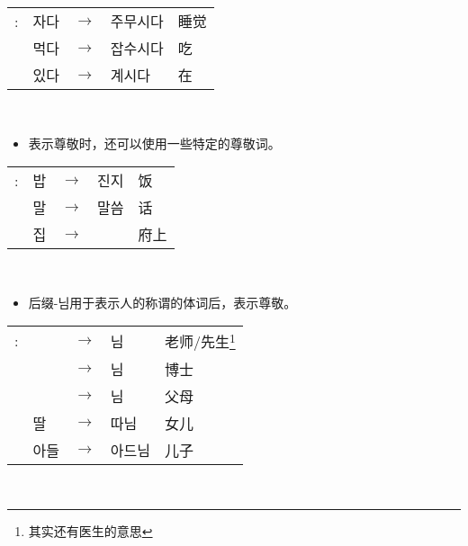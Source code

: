 \begin{grammar}
\begin{grammarsect}[\kr -(으){}시-]
\begin{tabular}{lllll}
            \kr \ruby{例}{예}: &\kr 자다&$\to$&\kr 주무시다&睡觉\\
            &\kr 먹다 &$\to$&\kr 잡수시다&吃\\
            &\kr 있다 &$\to$&\kr 계시다&在
        \end{tabular}\\
        \begin{itemize}
            \item 表示尊敬时，还可以使用一些特定的尊敬词。
        \end{itemize}
        \begin{tabular}{lllll}
            \kr \ruby{例}{예}: &\kr 밥&$\to$& \kr 진지& 饭\\
            &\kr 말&$\to$&\kr 말씀& 话\\
            &\kr 집&$\to$& \kr \ruby{宅}{댁}& 府上
        \end{tabular}\\
        \begin{itemize}
            \item 后缀{\kr -님}用于表示人的称谓的体词后，表示尊敬。
        \end{itemize}
        \begin{tabular}{lllll}
            \kr \ruby{例}{예}:&\kr \ruby{先生}{선생}&$\to$&\kr  \ruby{先生}{선생}님 &老师/先生\footnote{其实还有医生的意思}\\
            &\kr \ruby{博士}{박사} &$\to$&\kr  \ruby{博士}{박사}님 &博士 \\
            &\kr \ruby{父母}{부모} &$\to$&\kr  \ruby{父母}{부모}님 &父母 \\
            &\kr 딸&$\to$&\kr  따님 &女儿 \\
            &\kr 아들 &$\to$&\kr  아드님 &儿子
        \end{tabular}\\
    \end{grammarsect}
\end{grammar}
